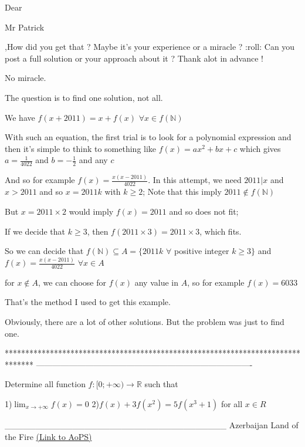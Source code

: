 \begin{solution}
	\begin{tcolorbox}Dear \begin{bolded}Mr Patrick\end{bolded},How did you get that ? Maybe it's your experience or a miracle  ? :roll: 
Can you post a full solution or your approach about it ?
Thank alot in advance !\end{tcolorbox}
No miracle.

The question is to find one solution, not all.

We have $f(x+2011)=x+f(x)$ $\forall x\in f(\mathbb N)$

With such an equation, the first trial is to look for a polynomial expression and then it's simple to think to something like $f(x)=ax^2+bx+c$ which gives $a=\frac 1{4022}$ and $b=-\frac 12$ and any $c$

And so for example $f(x)=\frac{x(x-2011)}{4022}$. In this attempt, we need $2011|x$ and $x>2011$ and so $x=2011k$ with $k\ge 2$; Note that this imply $2011\notin f(\mathbb N)$

But $x=2011\times 2$ would imply $f(x)=2011$ and so does not fit;

If we decide that $k\ge 3$, then $f(2011\times 3)=2011\times 3$, which fits.

So we can decide that $f(\mathbb N)\subseteq A=\{2011k$ $\forall$ positive integer $k\ge 3\}$ and $f(x)=\frac{x(x-2011)}{4022}$ $\forall x\in A$

for $x\notin A$, we can choose for $f(x)$ any value in $A$, so for example $f(x)=6033$

That's the method I used to get this example.

Obviously, there are a lot of other solutions. But the problem was just to find one.
\end{solution}
*******************************************************************************
-------------------------------------------------------------------------------

\begin{problem}
	Determine all function $f: \mathbb[0;+\infty)\to\mathbb{R}$ such that

1)$\lim_{x\to+\infty}f(x)=0$    2)$f(x)+3f(x^2)=5f(x^3+1)$ for all $x\in{R}$


____________________________________
Azerbaijan Land of the Fire 
	\flushright \href{https://artofproblemsolving.com/community/c6h447138}{(Link to AoPS)}
\end{problem}



